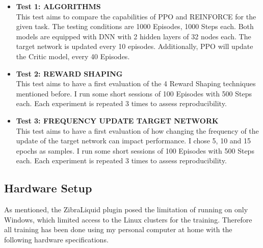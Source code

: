 \begin{itemize}
\item {\bf Test 1: ALGORITHMS}\\
This test aims to compare the capabilities of PPO and REINFORCE for the given task. The testing conditions are 1000 Episodes, 1000 Steps each. Both models are equipped with DNN with 2 hidden layers of 32 nodes each. The target network is updated every 10 episodes. Additionally, PPO will update the Critic model, every 40 Episodes.

\item {\bf Test 2: REWARD SHAPING}\\
This test aims to have a first evaluation of the 4 Reward Shaping techniques mentioned before. I run some short sessions of 100 Episodes with 500 Steps each. Each experiment is repeated 3 times to assess reproducibility.

\item {\bf Test 3: FREQUENCY UPDATE TARGET NETWORK}\\
This test aims to have a first evaluation of how changing the frequency of the update of the target network can impact performance. I chose 5, 10 and 15 epochs as samples. I run some short sessions of 100 Episodes with 500 Steps each. Each experiment is repeated 3 times to assess reproducibility.

\end{itemize}
\newpage

\subsection{Hardware Setup}

\begin{textblock}
As mentioned, the ZibraLiquid plugin posed the limitation of running on only Windows, which limited access to the Linux clusters for the training.
Therefore all training has been done using my personal computer at home with the following hardware specifications.
\end{textblock}



